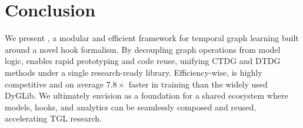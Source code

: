 \section{Conclusion}

We present \name, a modular and efficient framework for temporal graph learning built around a novel hook formalism. By decoupling graph operations from model logic, \name enables rapid prototyping and code reuse, unifying CTDG and DTDG methods under a single research-ready library. Efficiency-wise, \name is highly competitive and on average $7.8\times$ faster in training than the widely used DyGLib. 
We ultimately envision \name as a foundation for a shared ecosystem where models, hooks, and analytics can be seamlessly composed and reused, accelerating TGL research.



